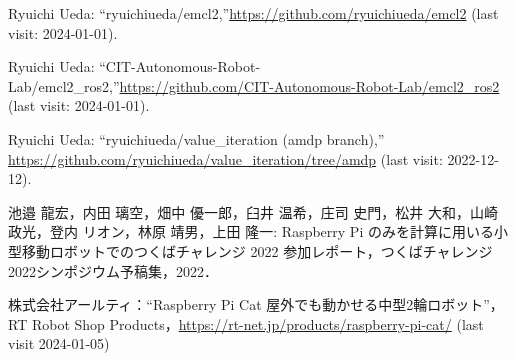 \documentclass[twocolumn,9pt]{jsproceedings}
\begin{document}
\begin{thebibliography}{99}

  Ryuichi Ueda: ``ryuichiueda/emcl2,''\url{https://github.com/ryuichiueda/emcl2} (last visit: 2024-01-01).

  Ryuichi Ueda: ``CIT-Autonomous-Robot-Lab/emcl2\_ros2,''\url{https://github.com/CIT-Autonomous-Robot-Lab/emcl2_ros2} (last visit: 2024-01-01).

  Ryuichi Ueda: ``ryuichiueda/value\_iteration (amdp branch),''\\\url{https://github.com/ryuichiueda/value_iteration/tree/amdp} (last visit: 2022-12-12).





  池邉 龍宏，内田 璃空，畑中 優一郎，臼井 温希，庄司 史門，松井 大和，山崎 政光，登内 リオン，林原 靖男，上田 隆一: Raspberry Pi のみを計算に用いる小型移動ロボットでのつくばチャレンジ 2022 参加レポート，つくばチャレンジ2022シンポジウム予稿集，2022．




  株式会社アールティ：``Raspberry Pi Cat 屋外でも動かせる中型2輪ロボット''，
  RT Robot Shop Products，\url{https://rt-net.jp/products/raspberry-pi-cat/} (last visit 2024-01-05)


\end{thebibliography}
\end{document}
